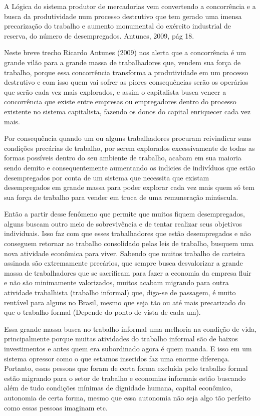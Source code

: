\begin{citacao}
A Lógica do sistema produtor de mercadorias vem convertendo a concorrência e a busca da produtividade 
num processo destrutivo que tem gerado uma imensa precarização do trabalho e aumento monumental do 
exército industrial de reserva, do número de desempregados. Antunes, 2009, pág 18. 
\end{citacao}

Neste breve trecho Ricardo Antunes (2009) nos alerta que a concorrência é um grande vilão para a 
grande massa de trabalhadores que, vendem sua força de trabalho, porque essa concorrência transforma 
a produtividade em um processo destrutivo e com isso quem vai sofrer as piores consequências serão 
os operários que serão cada vez mais explorados, e assim o capitalista busca vencer a concorrência 
que existe entre empresas ou empregadores dentro do processo existente no sistema capitalista, 
fazendo os donos do capital enriquecer cada vez mais.

Por consequência quando um ou alguns trabalhadores procuram reivindicar suas condições precárias 
de trabalho, por serem explorados excessivamente de todas as formas possíveis dentro do seu ambiente 
de trabalho, acabam em sua maioria sendo demito e consequentemente aumentando os indicies de indivíduos 
que estão desempregados por conta de um sistema que necessita que existam desempregados em grande 
massa para poder explorar cada vez mais quem só tem sua força de trabalho para vender em troca de uma 
remuneração minúscula. 

Então a partir desse fenômeno que permite que muitos fiquem desempregados, alguns buscam outro meio de 
sobrevivência e de tentar realizar seus objetivos individuais. Isso faz com que esses trabalhadores que 
estão desempregados e não conseguem retornar ao trabalho consolidado pelas leis de trabalho, busquem 
uma nova atividade econômica para viver. Sabendo que muitos trabalho de carteira assinada são extremamente 
precários, que sempre busca desvalorizar a grande massa de trabalhadores que se sacrificam para fazer 
a economia da empresa fluir e não são minimamente valorizados, muitos acabam migrando para outra atividade 
trabalhista (trabalho informal) que, diga-se de passagem, é muito rentável para alguns no Brasil, mesmo 
que seja tão ou até mais precarizado do que o trabalho formal (Depende do ponto de vista de cada um). 

Essa grande massa busca no trabalho informal uma melhoria na condição de vida, principalmente porque 
muitas atividades do trabalho informal são de baixos investimentos e antes quem era subordinado agora 
é quem manda. E isso em um sistema opressor como o que estamos inseridos faz uma enorme diferença. 
Portanto, essas pessoas que foram de certa forma excluída pelo trabalho formal estão migrando para o 
setor de trabalho e economias informais estão buscando além de tudo condições mínimas de dignidade 
humana, capital econômico, autonomia de certa forma, mesmo que essa autonomia não seja algo tão 
perfeito como essas pessoas imaginam etc.

